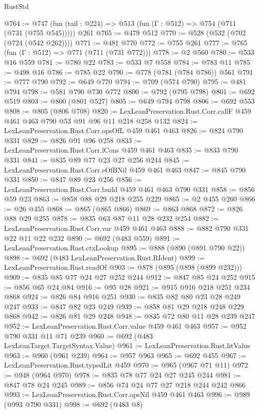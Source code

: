 \begin{lexlean}{RustStd}
\begin{coremodule}
{\begin{coremodule}
{{{{{{{@764 := @747 (fun (tail : @224) => @513 (fun (Γ : @512) => @754 (@711 (@731 (@755 @545))))) @261
@765 := @479 @512
@770 := @528 (@532 (@702 (@724 (@542 @262))))
@771 := @481 @770
@772 := @755 @261
@777 := @765 (fun (Γ : @512) => @771 (@711 (@731 @772)))
@778 := @2 @560
@780 := @533 @16 @559
@781 := @780 @22
@783 := @533 @7 @558
@784 := @783 @11
@785 := @498 @16
@786 := @785 @22
@790 := @778 (@781 (@784 @786)) @561
@791 := @777 @790
@792 := @649 @770
@794 := @709 (@574 @790)
@795 := @481 @794
@798 := @581 @790 @730 @772
@800 := @792 (@795 @798)
@801 := @692 @519
@803 := @800 (@801 @527)
@805 := @649 @794 @798
@806 := @692 @553
@808 := @805 (@806 @708)
@820 := LexLeanPreservation.Rust.Corr.callF @459 @461 @463 @790 @53 @91 @96 @11 @218 @258 @132
@824 := LexLeanPreservation.Rust.Corr.opsOfL @459 @461 @463
@826 := @824 @790 @331
@829 := @826 @91 @96 @258
@833 := LexLeanPreservation.Rust.Corr.lCons @459 @461 @463
@835 := @833 @790 @331
@841 := @835 @89 @77 @23 @27 @256 @244
@845 := LexLeanPreservation.Rust.Corr.eOfBNil @459 @461 @463
@847 := @845 @790 @331
@850 := @847 @89 @23 @256
@856 := LexLeanPreservation.Rust.Corr.build @459 @461 @463 @790 @331
@858 := @856 @59 @23
@863 := @858 @88 @29 @218 @255 @229
@865 := @2 @455 @260
@866 := @26 @455
@868 := @865 (@865 @866)
@869 := @863 @868
@872 := @826 @88 @29 @255
@878 := @835 @63 @87 @11 @28 @232 @254
@882 := LexLeanPreservation.Rust.Corr.var @459 @461 @463
@888 := @882 @790 @331 @22 @11 @22 @232
@890 := @692 (@483 @559)
@891 := LexLeanPreservation.Rust.ctxLookup
@895 := @888 (@890 (@891 @790 @22))
@898 := @692 (@483 LexLeanPreservation.Rust.RIdent)
@899 := LexLeanPreservation.Rust.readOf
@903 := @878 (@895 (@898 (@899 @232)))
@909 := @835 @85 @77 @24 @27 @252 @244
@912 := @847 @85 @24 @252
@915 := @856 @65 @24 @84
@916 := @95 @28
@921 := @915 @916 @218 @251 @234 @868
@924 := @826 @84 @916 @251
@930 := @835 @82 @80 @23 @28 @249 @247
@933 := @847 @82 @23 @249
@939 := @858 @81 @29 @218 @248 @229 @868
@942 := @826 @81 @29 @248
@948 := @835 @72 @80 @11 @28 @239 @247
@952 := LexLeanPreservation.Rust.Corr.value @459 @461 @463
@957 := @952 @790 @331 @11 @71 @239
@960 := @692 (@483 LexLeanTarget.TargetSyntax.Value)
@961 := LexLeanPreservation.Rust.litValue
@963 := @960 (@961 @239)
@964 := @957 @963
@965 := @692 @455
@967 := LexLeanPreservation.Rust.typedLit @459
@970 := @965 (@967 @71 @11)
@972 := @948 (@964 @970)
@978 := @835 @78 @77 @24 @27 @245 @244
@981 := @847 @78 @24 @245
@989 := @856 @74 @24 @77 @27 @218 @244 @242 @866
@993 := LexLeanPreservation.Rust.Corr.opsNil @459 @461 @463
@996 := @989 (@993 @790 @331)
@998 := @692 (@483 @8)
}}}}}}}
\end{coremodule}}
\end{coremodule}
\end{lexlean}
